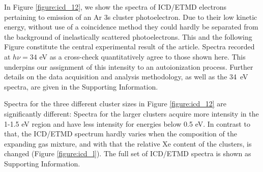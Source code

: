 %
In Figure \ref{figure:icd_12}, we show the spectra of ICD/ETMD electrons pertaining to emission of an Ar 3s cluster photoelectron. 
Due to their low kinetic energy, without use of a coincidence method they could hardly be separated from the background of inelastically scattered photoelectrons.\cite{mucke}
This and the following Figure constitute the central experimental result of the article.
Spectra recorded at $h\nu = 34$ eV as a cross-check quantitatively agree to those shown here.
This underpins our assignment of this intensity to an autoionization process.
Further details on the data acquisition and analysis methodology, as well as the 34~eV spectra, are given in the Supporting Information.

Spectra for the three different cluster sizes in Figure \ref{figure:icd_12} are significantly different: Spectra for the larger clusters acquire more intensity in the 1-1.5 eV region and have less intensity for energies below 0.5 eV.
In contrast to that, the ICD/ETMD spectrum hardly varies when the composition of the expanding gas mixture, and with that the relative Xe content of the clusters, is changed (Figure \ref{figure:icd_l}).
The full set of ICD/ETMD spectra is shown as Supporting Information.

